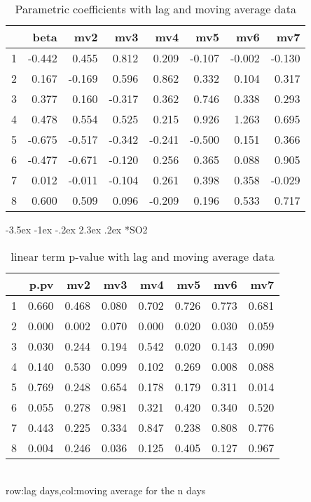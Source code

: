 \documentclass[a4paper, 12pt]{article}
\makeatletter
\def\large{\fontsize{14}{20}\selectfont}
\renewcommand\subsection{\@startsection {subsection}{1}{\z@}%
                                   {-3.5ex \@plus -1ex \@minus -.2ex}%
                                   {2.3ex \@plus.2ex}%
                                   {\centering\normalfont\large\bfseries}}
\makeatother
\begin{document}
\begin{table}[h]
\centering
\caption{Parametric coefficients with lag and moving average data}
\begin{tabular}{rrrrrrrr}
  \hline
 & beta & mv2 & mv3 & mv4 & mv5 & mv6 & mv7 \\
  \hline
1 & -0.442 & 0.455 & 0.812 & 0.209 & -0.107 & -0.002 & -0.130 \\
  2 & 0.167 & -0.169 & 0.596 & 0.862 & 0.332 & 0.104 & 0.317 \\
  3 & 0.377 & 0.160 & -0.317 & 0.362 & 0.746 & 0.338 & 0.293 \\
  4 & 0.478 & 0.554 & 0.525 & 0.215 & 0.926 & 1.263 & 0.695 \\
  5 & -0.675 & -0.517 & -0.342 & -0.241 & -0.500 & 0.151 & 0.366 \\
  6 & -0.477 & -0.671 & -0.120 & 0.256 & 0.365 & 0.088 & 0.905 \\
  7 & 0.012 & -0.011 & -0.104 & 0.261 & 0.398 & 0.358 & -0.029 \\
  8 & 0.600 & 0.509 & 0.096 & -0.209 & 0.196 & 0.533 & 0.717 \\
   \hline
\end{tabular}
\end{table}
\clearpage
\subsection*{SO2}
\begin{table}[h]
\centering
\caption{linear term p-value with lag and moving average data}
\begin{tabular}{rrrrrrrr}
  \hline
 & p.pv & mv2 & mv3 & mv4 & mv5 & mv6 & mv7 \\
  \hline
1 & 0.660 & 0.468 & 0.080 & 0.702 & 0.726 & 0.773 & 0.681 \\
  2 & 0.000 & 0.002 & 0.070 & 0.000 & 0.020 & 0.030 & 0.059 \\
  3 & 0.030 & 0.244 & 0.194 & 0.542 & 0.020 & 0.143 & 0.090 \\
  4 & 0.140 & 0.530 & 0.099 & 0.102 & 0.269 & 0.008 & 0.088 \\
  5 & 0.769 & 0.248 & 0.654 & 0.178 & 0.179 & 0.311 & 0.014 \\
  6 & 0.055 & 0.278 & 0.981 & 0.321 & 0.420 & 0.340 & 0.520 \\
  7 & 0.443 & 0.225 & 0.334 & 0.847 & 0.238 & 0.808 & 0.776 \\
  8 & 0.004 & 0.246 & 0.036 & 0.125 & 0.405 & 0.127 & 0.967 \\
   \hline
\end{tabular}
\\row:lag days,col:moving average for the n days
\end{table}
\end{document}
